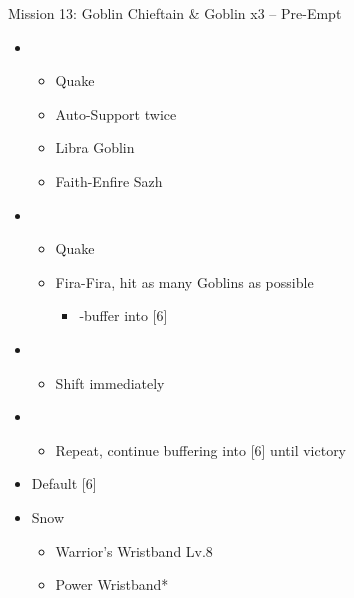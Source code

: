 \begin{battle}{Mission 13: Goblin Chieftain \& Goblin x3 -- Pre-Empt}
	\begin{itemize}
		\item \third
			\begin{itemize}
				\item Quake
				\item Auto-Support twice
				\item Libra Goblin
				\item Faith-Enfire Sazh
			\end{itemize}
		\item \second
			\begin{itemize}
				\item Quake
				\item Fira-Fira, hit as many Goblins as possible
					\begin{itemize}
						\item \com-buffer into [6]
					\end{itemize}
			\end{itemize}
		\item \sixth
			\begin{itemize}
				\item Shift immediately
			\end{itemize}
		\item \second
			\begin{itemize}
				\item Repeat, continue buffering into [6] until victory
			\end{itemize}
	\end{itemize}
\end{battle}

\begin{menu}
	\begin{itemize}
		\paradigm
		\begin{itemize}
			\item Default [6]
		\end{itemize}
		\equip
		\begin{itemize}
			\item Snow
			      \begin{itemize}
				      \item Warrior's Wristband Lv.8
				      \item Power Wristband*
			      \end{itemize}
		\end{itemize}
	\end{itemize}
\end{menu}

